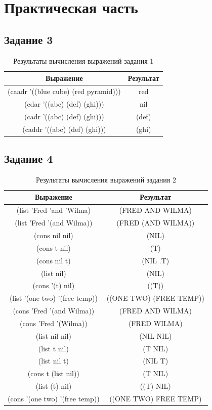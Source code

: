\chapter{Практическая часть}
\section{Задание \No{}3}
\begin{table}[H]
    \centering
    \caption{Результаты вычисления выражений задания \No{}1}
	\begin{tabular}{|c|c|}
 	\hline
    Выражение & Результат \\
 	\hline
 	(caadr '((blue cube) (red pyramid))) & red \\
 	\hline
 	(cdar '((abc) (def) (ghi))) & nil \\
 	\hline
    (cadr '((abc) (def) (ghi))) & (def) \\
 	\hline
    (caddr '((abc) (def) (ghi))) & (ghi) \\
 	\hline
	\end{tabular}
\end{table}
\section{Задание \No{}4}
\begin{table}[H]
    \centering
    \caption{Результаты вычисления выражений задания \No{}2}
	\begin{tabular}{|c|c|}
 	\hline
    Выражение & Результат \\
 	\hline
    (list 'Fred 'and 'Wilma) & (FRED AND WILMA) \\
 	\hline
    (list 'Fred '(and Wilma)) & (FRED (AND WILMA))\\
 	\hline
    (cons nil nil) & (NIL) \\
 	\hline
    (cons t nil) & (T) \\
 	\hline
    (cons nil t) & (NIL .T)\\
 	\hline
    (list nil) & (NIL) \\
 	\hline
    (cons '(t) nil) & ((T)) \\
 	\hline
    (list '(one two) '(free temp)) & ((ONE TWO) (FREE TEMP)) \\
 	\hline
    (cons 'Fred '(and Wilma)) & (FRED AND WILMA) \\
 	\hline
    (cons 'Fred '(Wilma)) & (FRED WILMA) \\
 	\hline
    (list nil nil) & (NIL NIL) \\
 	\hline
    (list t nil) & (T NIL) \\
 	\hline
    (list nil t) & (NIL T) \\
 	\hline
    (cons t (list nil)) & (T NIL) \\
 	\hline
    (list (t) nil) & ((T) NIL) \\
 	\hline
    (cons '(one two) '(free temp)) & ((ONE TWO) FREE TEMP) \\
 	\hline
	\end{tabular}
\end{table}


